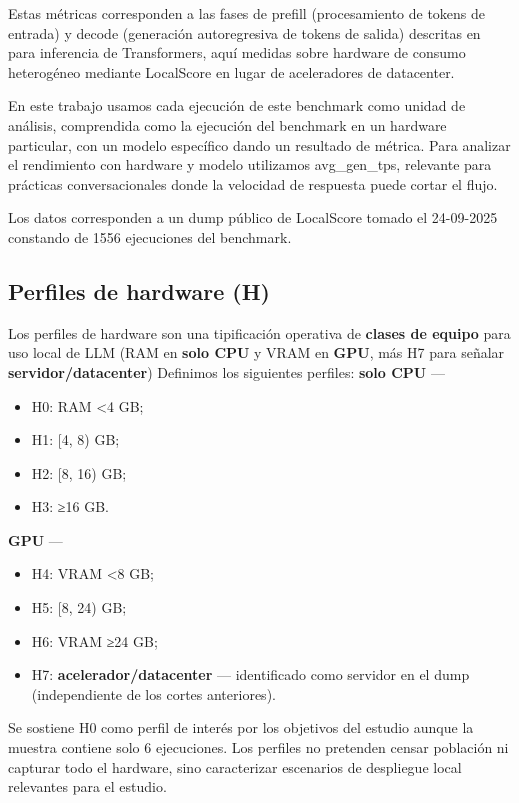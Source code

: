 \documentclass{llncs}
\begin{document}
Estas métricas corresponden a las fases de prefill (procesamiento de tokens de entrada) y decode (generación autoregresiva de tokens de salida) descritas en \textcite{pope2022} para inferencia de Transformers, aquí medidas sobre hardware de consumo heterogéneo mediante LocalScore en lugar de aceleradores de datacenter.

En este trabajo usamos cada ejecución de este benchmark como unidad de análisis,
comprendida como la ejecución del benchmark en un hardware particular,
con un modelo específico dando un resultado de métrica. Para analizar el
rendimiento con hardware y modelo utilizamos avg\_gen\_tps, relevante
para prácticas conversacionales donde la velocidad de respuesta puede
cortar el flujo.

Los datos corresponden a un dump público de LocalScore tomado el
24-09-2025 constando de 1556 ejecuciones del benchmark.

\subsection{Perfiles de hardware (H)}\label{perfiles-de-hardware-h}

Los perfiles de hardware son una tipificación operativa de
\textbf{clases de equipo} para uso local de LLM (RAM en \textbf{solo
CPU} y VRAM en \textbf{GPU}, más H7 para señalar
\textbf{servidor/datacenter}) Definimos los siguientes perfiles: 
\textbf{solo CPU} --- 
\begin{itemize}
    \item H0: RAM \textless4 GB;
    \item H1: {[}4, 8) GB;
    \item H2: {[}8, 16) GB;
    \item H3: ≥16 GB.
\end{itemize}
\textbf{GPU} --- 
\begin{itemize}
    \item H4: VRAM \textless8 GB;
    \item H5: {[}8, 24) GB;
    \item H6: VRAM ≥24 GB;
    \item H7: \textbf{acelerador/datacenter} --- identificado como servidor en el dump (independiente de los cortes anteriores).
\end{itemize}
Se sostiene H0 como perfil de interés por los objetivos del estudio aunque la muestra
contiene solo 6 ejecuciones. Los perfiles no pretenden censar población ni capturar todo el hardware, sino caracterizar escenarios de despliegue local relevantes para el estudio.
\end{document}
